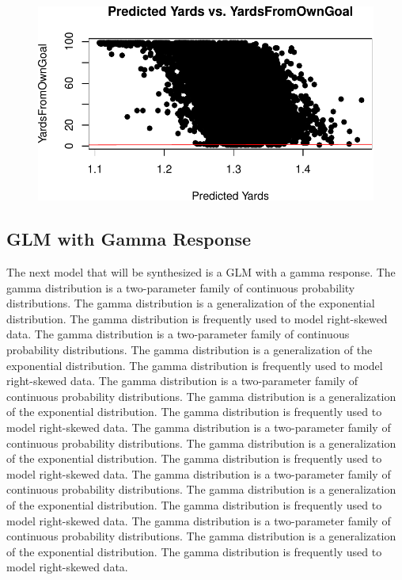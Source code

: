 \documentclass[
  super,
  preprint,
  3p]{elsarticle}
\begin{document}
\begin{figure}[H]

{\centering \includegraphics{project_report_files/figure-pdf/unnamed-chunk-40-1.pdf}

}

\end{figure}

\hypertarget{glm-with-gamma-response}{%
\subsection{GLM with Gamma Response}\label{glm-with-gamma-response}}

The next model that will be synthesized is a GLM with a gamma response.
The gamma distribution is a two-parameter family of continuous
probability distributions. The gamma distribution is a generalization of
the exponential distribution. The gamma distribution is frequently used
to model right-skewed data. The gamma distribution is a two-parameter
family of continuous probability distributions. The gamma distribution
is a generalization of the exponential distribution. The gamma
distribution is frequently used to model right-skewed data. The gamma
distribution is a two-parameter family of continuous probability
distributions. The gamma distribution is a generalization of the
exponential distribution. The gamma distribution is frequently used to
model right-skewed data. The gamma distribution is a two-parameter
family of continuous probability distributions. The gamma distribution
is a generalization of the exponential distribution. The gamma
distribution is frequently used to model right-skewed data. The gamma
distribution is a two-parameter family of continuous probability
distributions. The gamma distribution is a generalization of the
exponential distribution. The gamma distribution is frequently used to
model right-skewed data. The gamma distribution is a two-parameter
family of continuous probability distributions. The gamma distribution
is a generalization of the exponential distribution. The gamma
distribution is frequently used to model right-skewed data.
\end{document}
